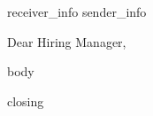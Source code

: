 
\begin{letter} 
{{{receiver_info}}}
{{sender_info}}
{}
\opening{\hspace{1em} Dear Hiring Manager,}
{{body}}
\closing{{{closing}}}
\end{letter}

